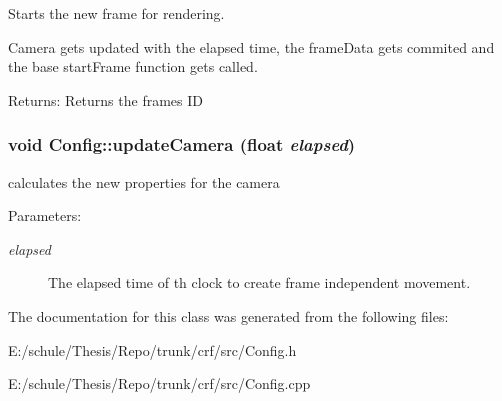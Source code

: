 Starts the new frame for rendering. 

Camera gets updated with the elapsed time, the frameData gets commited and the base startFrame function gets called. \begin{Desc}
\item[Returns:]Returns the frames ID \end{Desc}
\hypertarget{a00003_b7754b48a74e7927643d3e2e6ca3c8ed}{
\subsubsection[{updateCamera}]{\setlength{\rightskip}{0pt plus 5cm}void Config::updateCamera (float {\em elapsed})}}
\label{a00003_b7754b48a74e7927643d3e2e6ca3c8ed}


calculates the new properties for the camera 

\begin{Desc}
\item[Parameters:]
\begin{description}
\item[{\em elapsed}]The elapsed time of th clock to create frame independent movement. \end{description}
\end{Desc}


The documentation for this class was generated from the following files:\begin{CompactItemize}
\item 
E:/schule/Thesis/Repo/trunk/crf/src/Config.h\item 
E:/schule/Thesis/Repo/trunk/crf/src/Config.cpp\end{CompactItemize}
